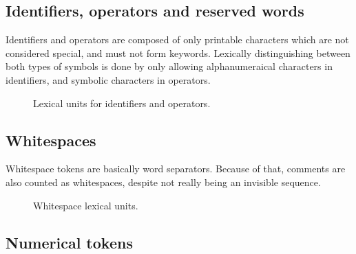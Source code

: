 \subsection{Identifiers, operators and reserved words}\label{subsec:zilch-grammar-lexical-identifiers}

Identifiers and operators are composed of only printable characters which are not considered special, and must not form keywords.
Lexically distinguishing between both types of symbols is done by only allowing alphanumeraical characters in identifiers, and symbolic characters in operators.

\begin{figure}[H]
	\centering


	\caption{Lexical units for identifiers and operators.}
	\label{fig:zilch-grammar-lexical-identifiers-grammar}
\end{figure}

\subsection{Whitespaces}\label{subsec:zilch-grammar-lexical-whitespaces}

Whitespace tokens are basically word separators.
Because of that, comments are also counted as whitespaces, despite not really being an invisible sequence.

\begin{figure}[H]
	\centering


	\caption{Whitespace lexical units.}
	\label{fig:zilch-grammar-lexical-whitespaces-grammar}
\end{figure}

\subsection{Numerical tokens}\label{subsec:zilch-grammar-lexical-numbers}

